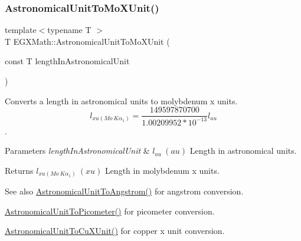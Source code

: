\subsubsection{\texorpdfstring{Astronomical\+Unit\+To\+Mo\+X\+Unit()}{AstronomicalUnitToMoXUnit()}}
{\footnotesize\ttfamily template$<$typename T $>$ \\
T E\+G\+X\+Math\+::\+Astronomical\+Unit\+To\+Mo\+X\+Unit (\begin{DoxyParamCaption}\item[{const T}]{length\+In\+Astronomical\+Unit }\end{DoxyParamCaption})}



Converts a length in astronomical units to molybdenum x units. \[ l_{xu(Mo\ K\alpha_1)}=\frac{149597870700}{1.00209952*10^{-13}} l_{au} \]. 


\begin{DoxyParams}{Parameters}
{\em length\+In\+Astronomical\+Unit} & $ l_{au}\ (au)$ Length in astronomical units. \\
\hline
\end{DoxyParams}
\begin{DoxyReturn}{Returns}
$ l_{xu(Mo\ K\alpha_1)}\ (xu)$ Length in molybdenum x units. 
\end{DoxyReturn}
\begin{DoxySeeAlso}{See also}
\mbox{\hyperlink{group___e_g_x_math-_conversions-_length_conversions-_astronomical-_astronomical_unit-_non-_s_i_ga5efd14d5ca13719b7e06c4614ac0faba}{Astronomical\+Unit\+To\+Angstrom()}} for angstrom conversion. 

\mbox{\hyperlink{group___e_g_x_math-_conversions-_length_conversions-_astronomical-_astronomical_unit-_s_i_gaf512b8f1ace4be83fbeb252b447405d6}{Astronomical\+Unit\+To\+Picometer()}} for picometer conversion. 

\mbox{\hyperlink{group___e_g_x_math-_conversions-_length_conversions-_astronomical-_astronomical_unit-_non-_s_i_ga00eedd6324f9a6b31af3ae3fa14ca644}{Astronomical\+Unit\+To\+Cu\+X\+Unit()}} for copper x unit conversion. 
\end{DoxySeeAlso}
